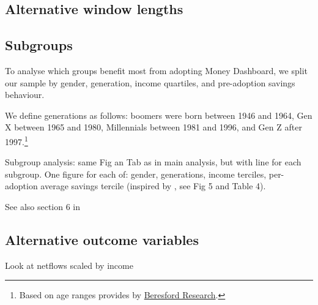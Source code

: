 \subsection{Alternative window lengths}%
\label{sub:alternative_window_lengths}

\subsection{Subgroups}%
\label{sub:subgroups}

To analyse which groups benefit most from adopting Money Dashboard, we split
our sample by gender, generation, income quartiles, and pre-adoption savings
behaviour.

We define generations as follows: boomers were born between 1946 and 1964, Gen
X between 1965 and 1980, Millennials between 1981 and 1996, and Gen Z after
1997.\footnote{Based on age ranges provides by
    \href{https://www.beresfordresearch.com/age-range-by-generation/}{Beresford
Research}.}

Subgroup analysis: same Fig an Tab as in main analysis, but with line for each
subgroup. One figure for each of: gender, generations, income terciles,
per-adoption average savings tercile (inspired by \citet{carlin2017fintech},
see Fig 5 and Table 4).

See also section 6 in \citet{gargano2021goal}


\subsection{Alternative outcome variables}%
\label{sub:alternative_outcome_variables}

Look at netflows scaled by income


